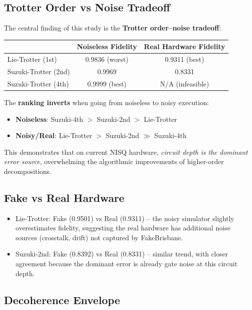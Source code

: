 \documentclass[11pt,a4paper]{article}
\begin{document}
\subsection{Trotter Order vs Noise Tradeoff}

The central finding of this study is the \textbf{Trotter order--noise tradeoff}:

\begin{center}
\begin{tabular}{lcc}
\toprule
& Noiseless Fidelity & Real Hardware Fidelity \\
\midrule
Lie-Trotter (1st) & 0.9836 (worst) & 0.9311 (best) \\
Suzuki-Trotter (2nd) & 0.9969 & 0.8331 \\
Suzuki-Trotter (4th) & 0.9999 (best) & N/A (infeasible) \\
\bottomrule
\end{tabular}
\end{center}

The \textbf{ranking inverts} when going from noiseless to noisy execution:
\begin{itemize}
    \item \textbf{Noiseless}: Suzuki-4th $>$ Suzuki-2nd $>$ Lie-Trotter
    \item \textbf{Noisy/Real}: Lie-Trotter $>$ Suzuki-2nd $\gg$ Suzuki-4th
\end{itemize}

This demonstrates that on current NISQ hardware, \emph{circuit depth is the dominant error source}, overwhelming the algorithmic improvements of higher-order decompositions.

\subsection{Fake vs Real Hardware}

\begin{itemize}
    \item Lie-Trotter: Fake (0.9501) vs Real (0.9311) -- the noisy simulator slightly overestimates fidelity, suggesting the real hardware has additional noise sources (crosstalk, drift) not captured by FakeBrisbane.
    \item Suzuki-2nd: Fake (0.8392) vs Real (0.8331) -- similar trend, with closer agreement because the dominant error is already gate noise at this circuit depth.
\end{itemize}

\subsection{Decoherence Envelope}
\end{document}
